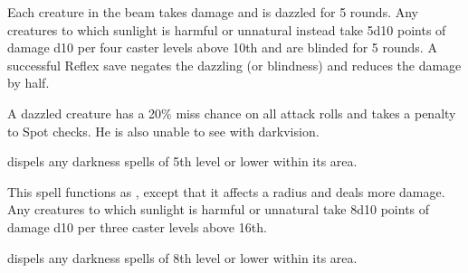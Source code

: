 \begin{spelleffect}
  Each creature in the beam takes damage and is dazzled for 5 rounds. Any creatures to which sunlight is harmful or unnatural instead take 5d10 points of damage \add d10 per four caster levels above 10th and are blinded for 5 rounds. A successful Reflex save negates the dazzling (or blindness) and reduces the damage by half.
\end{spelleffect}
\begin{spellnotes}
  A dazzled creature has a 20\% miss chance on all attack rolls and takes a  penalty to Spot checks. He is also unable to see with darkvision.
  
   dispels any darkness spells of 5th level or lower within its area.
\end{spellnotes}

\spellrng{\rngmed}
\begin{spelleffect}
  This spell functions as , except that it affects a \areamed radius and deals more damage. Any creatures to which sunlight is harmful or unnatural take 8d10 points of damage \add d10 per three caster levels above 16th.
\end{spelleffect}
\begin{spellnotes}
   dispels any darkness spells of 8th level or lower within its area.
\end{spellnotes}

\begin{comment}
\subsubsection{T}
\end{comment}

